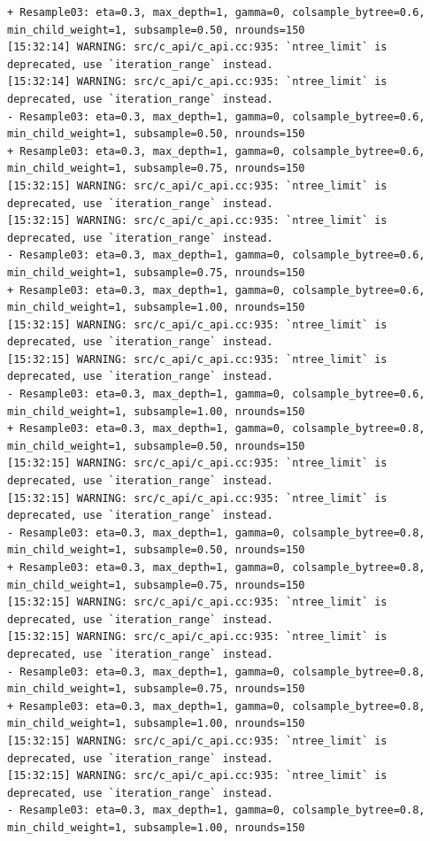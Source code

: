 \documentclass[
  letterpaper,
  DIV=11,
  numbers=noendperiod]{scrartcl}
\begin{document}
\begin{verbatim}
+ Resample03: eta=0.3, max_depth=1, gamma=0, colsample_bytree=0.6, min_child_weight=1, subsample=0.50, nrounds=150 
[15:32:14] WARNING: src/c_api/c_api.cc:935: `ntree_limit` is deprecated, use `iteration_range` instead.
[15:32:14] WARNING: src/c_api/c_api.cc:935: `ntree_limit` is deprecated, use `iteration_range` instead.
- Resample03: eta=0.3, max_depth=1, gamma=0, colsample_bytree=0.6, min_child_weight=1, subsample=0.50, nrounds=150 
+ Resample03: eta=0.3, max_depth=1, gamma=0, colsample_bytree=0.6, min_child_weight=1, subsample=0.75, nrounds=150 
[15:32:15] WARNING: src/c_api/c_api.cc:935: `ntree_limit` is deprecated, use `iteration_range` instead.
[15:32:15] WARNING: src/c_api/c_api.cc:935: `ntree_limit` is deprecated, use `iteration_range` instead.
- Resample03: eta=0.3, max_depth=1, gamma=0, colsample_bytree=0.6, min_child_weight=1, subsample=0.75, nrounds=150 
+ Resample03: eta=0.3, max_depth=1, gamma=0, colsample_bytree=0.6, min_child_weight=1, subsample=1.00, nrounds=150 
[15:32:15] WARNING: src/c_api/c_api.cc:935: `ntree_limit` is deprecated, use `iteration_range` instead.
[15:32:15] WARNING: src/c_api/c_api.cc:935: `ntree_limit` is deprecated, use `iteration_range` instead.
- Resample03: eta=0.3, max_depth=1, gamma=0, colsample_bytree=0.6, min_child_weight=1, subsample=1.00, nrounds=150 
+ Resample03: eta=0.3, max_depth=1, gamma=0, colsample_bytree=0.8, min_child_weight=1, subsample=0.50, nrounds=150 
[15:32:15] WARNING: src/c_api/c_api.cc:935: `ntree_limit` is deprecated, use `iteration_range` instead.
[15:32:15] WARNING: src/c_api/c_api.cc:935: `ntree_limit` is deprecated, use `iteration_range` instead.
- Resample03: eta=0.3, max_depth=1, gamma=0, colsample_bytree=0.8, min_child_weight=1, subsample=0.50, nrounds=150 
+ Resample03: eta=0.3, max_depth=1, gamma=0, colsample_bytree=0.8, min_child_weight=1, subsample=0.75, nrounds=150 
[15:32:15] WARNING: src/c_api/c_api.cc:935: `ntree_limit` is deprecated, use `iteration_range` instead.
[15:32:15] WARNING: src/c_api/c_api.cc:935: `ntree_limit` is deprecated, use `iteration_range` instead.
- Resample03: eta=0.3, max_depth=1, gamma=0, colsample_bytree=0.8, min_child_weight=1, subsample=0.75, nrounds=150 
+ Resample03: eta=0.3, max_depth=1, gamma=0, colsample_bytree=0.8, min_child_weight=1, subsample=1.00, nrounds=150 
[15:32:15] WARNING: src/c_api/c_api.cc:935: `ntree_limit` is deprecated, use `iteration_range` instead.
[15:32:15] WARNING: src/c_api/c_api.cc:935: `ntree_limit` is deprecated, use `iteration_range` instead.
- Resample03: eta=0.3, max_depth=1, gamma=0, colsample_bytree=0.8, min_child_weight=1, subsample=1.00, nrounds=150 

\end{verbatim}
\end{document}
